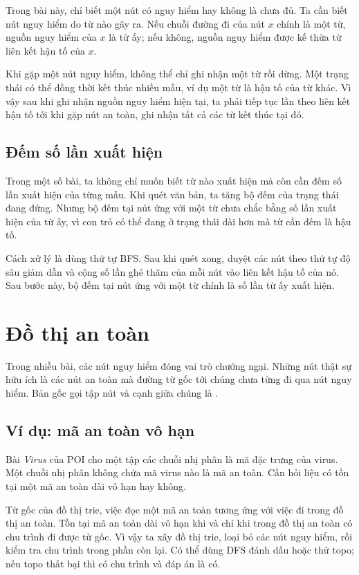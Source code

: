 \documentclass[11pt]{article}
\begin{document}
Trong bài này, chỉ biết một nút có nguy hiểm hay không là chưa đủ. Ta cần biết
nút nguy hiểm do từ nào gây ra. Nếu chuỗi đường đi của nút \(x\) chính là một
từ, nguồn nguy hiểm của \(x\) là từ ấy; nếu không, nguồn nguy hiểm được kế thừa
từ liên kết hậu tố của \(x\).

Khi gặp một nút nguy hiểm, không thể chỉ ghi nhận một từ rồi dừng. Một trạng
thái có thể đồng thời kết thúc nhiều mẫu, ví dụ một từ là hậu tố của từ khác.
Vì vậy sau khi ghi nhận nguồn nguy hiểm hiện tại, ta phải tiếp tục lần theo
liên kết hậu tố tới khi gặp nút an toàn, ghi nhận tất cả các từ kết thúc tại
đó.

\subsection{Đếm số lần xuất hiện}

Trong một số bài, ta không chỉ muốn biết từ nào xuất hiện mà còn cần đếm số
lần xuất hiện của từng mẫu. Khi quét văn bản, ta tăng bộ đếm của trạng thái
đang đứng. Nhưng bộ đếm tại nút ứng với một từ chưa chắc bằng số lần xuất hiện
của từ ấy, vì con trỏ có thể đang ở trạng thái dài hơn mà từ cần đếm là hậu tố.

Cách xử lý là dùng thứ tự BFS. Sau khi quét xong, duyệt các nút theo thứ tự độ
sâu giảm dần và cộng số lần ghé thăm của mỗi nút vào liên kết hậu tố của nó.
Sau bước này, bộ đếm tại nút ứng với một từ chính là số lần từ ấy xuất hiện.

\section{Đồ thị an toàn}

Trong nhiều bài, các nút nguy hiểm đóng vai trò chướng ngại. Những nút thật sự
hữu ích là các nút an toàn mà đường từ gốc tới chúng chưa từng đi qua nút nguy
hiểm. Bản gốc gọi tập nút và cạnh giữa chúng là .

\subsection{Ví dụ: mã an toàn vô hạn}

Bài \textit{Virus} của POI cho một tập các chuỗi nhị phân là mã đặc trưng của
virus. Một chuỗi nhị phân không chứa mã virus nào là mã an toàn. Cần hỏi liệu
có tồn tại một mã an toàn dài vô hạn hay không.

Từ gốc của đồ thị trie, việc đọc một mã an toàn tương ứng với việc đi trong đồ
thị an toàn. Tồn tại mã an toàn dài vô hạn khi và chỉ khi trong đồ thị an toàn
có chu trình đi được từ gốc. Vì vậy ta xây đồ thị trie, loại bỏ các nút nguy
hiểm, rồi kiểm tra chu trình trong phần còn lại. Có thể dùng DFS đánh dấu hoặc
thử topo; nếu topo thất bại thì có chu trình và đáp án là có.
\end{document}
